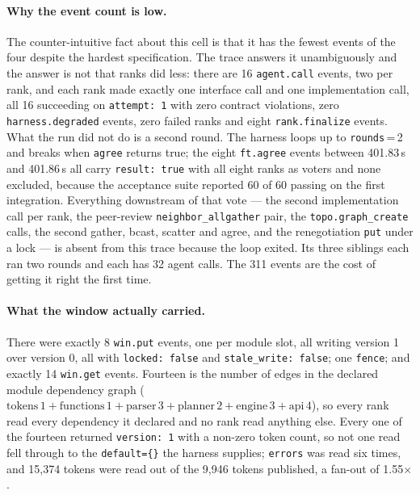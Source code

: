 \documentclass[11pt]{article}
\begin{document}
\paragraph{Why the event count is low.} The counter-intuitive fact about this cell is that it has
the fewest events of the four despite the hardest specification. The trace answers it
unambiguously and the answer is not that ranks did less: there are 16 \texttt{agent.call} events,
two per rank, and each rank made exactly one interface call and one implementation call, all 16
succeeding on \texttt{attempt: 1} with zero contract violations, zero
\texttt{harness.degraded} events, zero failed ranks and eight \texttt{rank.finalize} events. What
the run did not do is a second round. The harness loops up to \texttt{rounds}\,=\,2 and breaks
when \texttt{agree} returns true; the eight \texttt{ft.agree} events between 401.83\,s and
401.86\,s all carry \texttt{result: true} with all eight ranks as voters and none excluded,
because the acceptance suite reported 60 of
60 passing on the first integration. Everything downstream of that vote --- the second
implementation call per rank, the peer-review \texttt{neighbor\_allgather} pair, the
\texttt{topo.graph\_create} calls, the second gather, bcast, scatter and agree, and the
renegotiation \texttt{put} under a lock --- is absent from this trace because the loop exited.
Its three siblings each ran two rounds and each has 32 agent calls. The 311 events are the cost
of getting it right the first time.

\paragraph{What the window actually carried.} There were exactly 8 \texttt{win.put} events, one
per module slot, all writing version 1 over version 0, all with \texttt{locked: false} and
\texttt{stale\_write: false}; one \texttt{fence}; and exactly 14 \texttt{win.get} events. Fourteen
is the number of edges in the declared module dependency graph
($\text{tokens}\,1 + \text{functions}\,1 + \text{parser}\,3 + \text{planner}\,2 + \text{engine}\,3
+ \text{api}\,4$), so every rank read every dependency it declared and no rank read anything else.
Every one of the fourteen returned \texttt{version: 1} with a non-zero token count, so not one
read fell through to the \texttt{default=\{\}} the harness supplies; \texttt{errors} was read six
times, and 15{,}374 tokens were read out of the 9{,}946 tokens published, a fan-out of
1.55$\times$.
\end{document}
